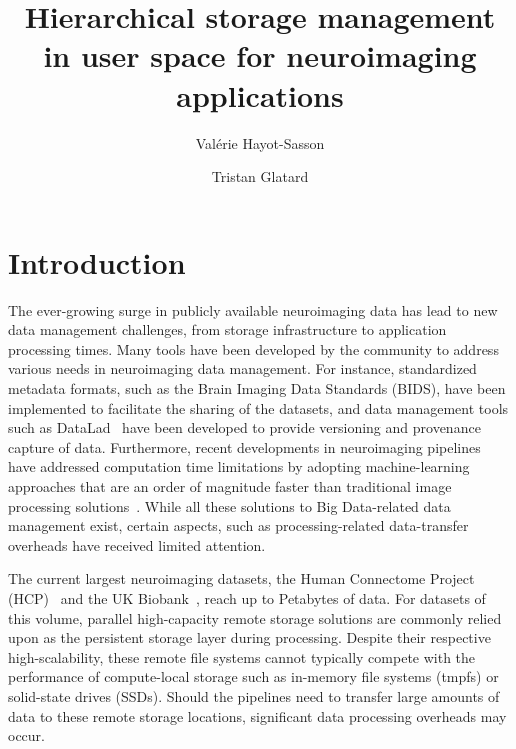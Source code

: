 \documentclass[fleqn,10pt]{wlscirep}
\title{Hierarchical storage management in user space for neuroimaging applications}
\author{Val\'erie Hayot-Sasson}
\author{Tristan Glatard}
\affil{Department of Computer Science and Software Engineering, Concordia University, Montreal, Canada}
\newcommand{\TG}[1]{\todo[color=green!60!black]{\textbf{\textsc{From Tristan:}} #1\xspace}}
\begin{document}
\flushbottom
\maketitle

\thispagestyle{empty}


 
  \section{Introduction}\label{sec:sea_neuro:introduction}
    
    The ever-growing surge in publicly available neuroimaging data has lead to new data
    management challenges, from storage infrastructure to application processing times.
    Many tools have been developed by the community to address various needs in 
    neuroimaging data management.
    For instance, standardized metadata formats, such as the Brain Imaging Data Standards (BIDS)\cite{gorgolewski2016brain},
    have been implemented to facilitate the sharing
    of the datasets, and data management tools such as DataLad~\cite{halchenko2021datalad} have been developed to provide 
    versioning and provenance capture of data.
    Furthermore, recent developments in neuroimaging pipelines have addressed computation time 
    limitations by adopting machine-learning approaches that are an order of magnitude faster than traditional image processing solutions~\cite{henschel2020fastsurfer,hoffmann2021synthmorph}.
    While all these solutions to Big Data-related data management exist, certain aspects, 
    such as processing-related data-transfer overheads
    have received limited attention.

    The current largest neuroimaging datasets,
    the Human Connectome Project (HCP)~\cite{HCP} and the UK
    Biobank~\cite{ukbiobank}, reach up to Petabytes of data. For datasets of this
    volume, parallel high-capacity remote storage solutions are commonly relied
    upon as the persistent storage layer during processing. 
    Despite their respective high-scalability, these remote file systems cannot typically
    compete with the performance of compute-local storage such as in-memory file systems (tmpfs) or solid-state drives (SSDs). Should the pipelines 
    need to transfer large amounts of data to these remote storage locations, significant data
    processing overheads may occur.
\end{document}
